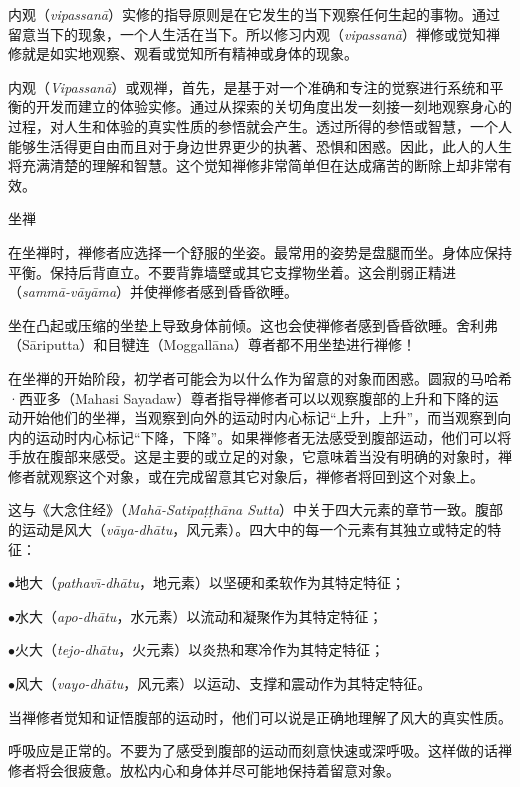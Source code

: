 内观（{\it vipassan\=a}）实修的指导原则是在它发生的当下观察任何生起的事物。通过留意当下的现象，一个人生活在当下。所以修习内观（{\it vipassan\=a}）禅修或觉知禅修就是如实地观察、观看或觉知所有精神或身体的现象。

内观（{\it Vipassan\=a}）或观禅，首先，是\1基于对一个准确和专注的觉察进行系统和平衡的开发而建立的体验实修。通过从探索的关切角度出发一刻接一刻地观察身心的过程，对人生和体验的真实性质的参悟就会产生。透过所得的参悟或智慧，一个人能够生活得更自由而且对于身边世界更少的执著、恐惧和困惑。因此，此人的人生将充满清楚的理解和智慧。这个觉知禅修非常简单但在达成痛苦的断除上却非常有效。

\ssssubsectnonib 坐禅

在坐禅时，禅修者应选择一个舒服的坐姿。最常用的姿势是盘腿而坐。身体应保持平衡。保持后背直立。不要背靠墙壁或其它支撑物坐着。这会削弱正精进（{\it samm\=a-v\=ay\=ama}）并使禅修者感到昏昏欲睡。

坐在凸起或压缩的坐垫上导致身体前倾。这也会使禅修者感到昏昏欲睡。舍利弗（S\=ariputta）和目犍连（Moggall\=ana）尊者都不用坐垫进行禅修！

在坐禅的开始阶段，初学者可能会为以什么作为留意的对象而困惑。圆寂的马哈希·西亚多（Mahasi Sayadaw）尊者指导禅修者可以以观察腹部的上升和下降的运动开始他们的坐禅，当观察到向外的运动时内心标记“上升，上升”，而当观察到向内的运动时内心标记“下降，下降”。如果禅修者无法感受到腹部运动，他们可以将手放在腹部来感受。这是主要的或立足的对象，它意味着当没有明确的对象时，禅修者就观察\1这个对象，或在完成留意其它对象后，禅修者将回到这个对象上。

这与《大念住经》（{\it Mah\=a-Satipa\d t\d th\=ana Sutta}）中关于四大元素的章节一致。腹部的运动是风大（{\it v\=aya-dh\=atu}，风元素）。四大中的每一个元素有其独立或特定的特征：

{
\leftskip=1.6pc
\item{$\bullet$}地大（{\it pathav\=\i-dh\=atu}，地元素）以坚硬和柔软作为其特定特征；
\item{$\bullet$}水大（{\it apo-dh\=atu}，水元素）以流动和凝聚作为其特定特征；
\item{$\bullet$}火大（{\it tejo-dh\=atu}，火元素）以炎热和寒冷作为其特定特征；
\item{$\bullet$}风大（{\it vayo-dh\=atu}，风元素）以运动、支撑和震动作为其特定特征。

}

当禅修者觉知和证悟腹部的运动时，他们可以说是正确地理解了风大的真实性质。

呼吸应是正常的。不要为了感受到腹部的运动而刻意快速或深呼吸。这样做的话禅修者将会很疲惫。放松内心和身体并尽可能地保持着留意对象。

